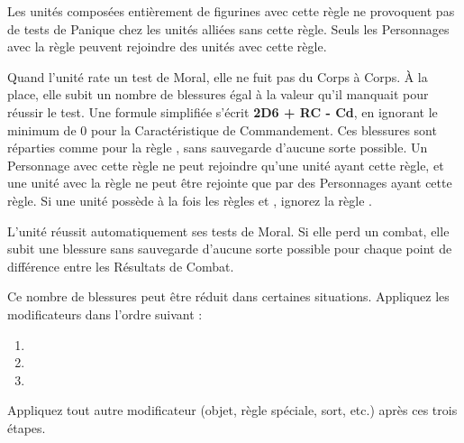 
Les unités composées entièrement de figurines avec cette règle ne provoquent pas de tests de Panique chez les unités alliées sans cette règle. Seuls les Personnages avec la règle \insignificant{} peuvent rejoindre des unités avec cette règle.

\label{daemonicinstability}

Quand l'unité rate un test de Moral, elle ne fuit pas du Corps à Corps. À la place, elle subit un nombre de blessures égal à la valeur qu'il manquait pour réussir le test. Une formule simplifiée s'écrit \textbf{2D6 + RC - Cd}, en ignorant le minimum de 0 pour la Caractéristique de Commandement. Ces blessures sont réparties comme pour la règle \unstable{}, sans sauvegarde d'aucune sorte possible. Un Personnage avec cette règle ne peut rejoindre qu'une unité ayant cette règle, et une unité avec la règle \daemonicinstability{} ne peut être rejointe que par des Personnages ayant cette règle. Si une unité possède à la fois les règles \daemonicinstability{} et \unstable{}, ignorez la règle \unstable{}.

\newpage
{}

L'unité réussit automatiquement ses tests de Moral. Si elle perd un combat, elle subit une blessure sans sauvegarde d'aucune sorte possible pour chaque point de différence entre les Résultats de Combat.

Ce nombre de blessures peut être réduit dans certaines situations. Appliquez les modificateurs dans l'ordre suivant :
\begin{enumerate}
\item {}
\item {}
\item {}
\end{enumerate}
Appliquez tout autre modificateur (objet, règle spéciale, sort, etc.) après ces trois étapes.

